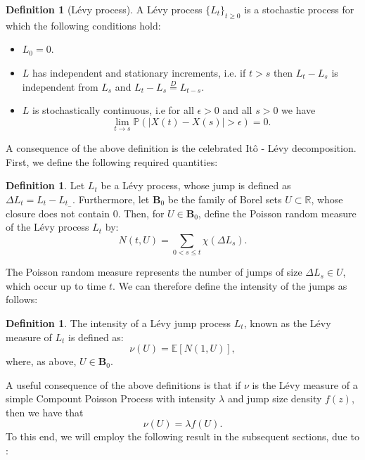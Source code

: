 \documentclass[11pt,reqno]{article}
\theoremstyle{definition}
\newtheorem{definition}[theorem]{Definition}
\begin{document}
\begin{definition}[L\'evy process]
	A L\'evy process $\{L_t\}_{t \geq 0} $ is a stochastic process for which the following conditions hold:
	\begin{itemize}
		\item $L_0=0$.
		\item $L$ has independent and stationary increments, i.e. if $ t >s$ then $L_t-L_s$ is independent from $ L_s$ and $L_t-L_s \stackrel{D}{=} L_{t-s}$.
		\item  $L$ is stochastically continuous, i.e for all $\epsilon >0 $ and all $ s >0$ we have $$\lim_{t \rightarrow s} \mathbb{P}(|X(t)-X(s)|>\epsilon)=0.$$
	\end{itemize}
\end{definition}

A consequence of the above definition is the celebrated It\^o - L\'evy decomposition. First, we define the following required quantities:

\begin{definition}
	Let $L_t$ be a L\'evy process, whose jump is defined as $\Delta L_t = L_t - L_{t_-}$. Furthermore, let $\textbf{B}_0$ be the family of Borel sets $U \subset \mathbb{R} $, whose closure does not contain 0. Then, for $U \in \textbf{B}_0$, define the Poisson random measure of the L\'evy process $L_t$ by: 
	$$ N(t,U) = \sum_{0 < s \leq t } \chi (\Delta L_s).$$ 
\end{definition}
The Poisson random measure represents the number of jumps of size $\Delta L_s \in U$, which occur up to time $t$. We can therefore define the intensity of the jumps as follows:
\begin{definition}
	The intensity of a L\'evy jump process $L_t$, known as the L\'evy measure of $L_t$ is defined as:
	$$\nu(U) = \mathbb{E}[N(1,U)],$$
	where, as above, $U \in \textbf{B}_0$.
\end{definition}
A useful consequence of the above definitions is that if $\nu$ is the L\'evy measure of a simple Compount Poisson Process with intensity $\lambda$ and jump size density $f(z)$, then we have that $$ \nu(U) = \lambda f(U).$$ To this end, we will employ the following result in the subsequent sections, due to \cite{kyprianou2006introductory}:
\end{document}
